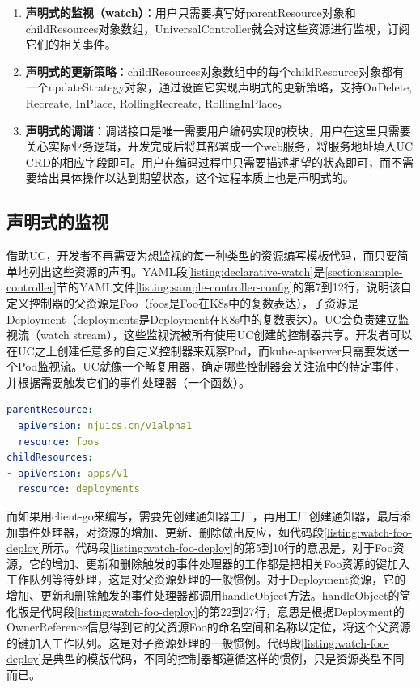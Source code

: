 \documentclass[macfonts,master]{njuthesis}
\begin{document}
\begin{enumerate}
	\item \textbf{声明式的监视（watch）}：用户只需要填写好parentResource对象和childResources对象数组，UniversalController就会对这些资源进行监视，订阅它们的相关事件。
	\item \textbf{声明式的更新策略}：childResources对象数组中的每个childResource对象都有一个updateStrategy对象，通过设置它实现声明式的更新策略，支持OnDelete, Recreate, InPlace, RollingRecreate, RollingInPlace。
	\item \textbf{声明式的调谐}：调谐接口是唯一需要用户编码实现的模块，用户在这里只需要关心实际业务逻辑，开发完成后将其部署成一个web服务，将服务地址填入UC CRD的相应字段即可。用户在编码过程中只需要描述期望的状态即可，而不需要给出具体操作以达到期望状态，这个过程本质上也是声明式的。
\end{enumerate}

\subsection{声明式的监视}

借助UC，开发者不再需要为想监视的每一种类型的资源编写模板代码，而只要简单地列出这些资源的声明。YAML段\ref{listing:declarative-watch}是\ref{section:sample-controller}节的YAML文件\ref{listing:sample-controller-config}的第7到12行，说明该自定义控制器的父资源是Foo（foos是Foo在K8s中的复数表达），子资源是Deployment（deployments是Deployment在K8s中的复数表达）。UC会负责建立监视流（watch stream），这些监视流被所有使用UC创建的控制器共享。开发者可以在UC之上创建任意多的自定义控制器来观察Pod，而kube-apiserver只需要发送一个Pod监视流。UC就像一个解复用器，确定哪些控制器会关注流中的特定事件，并根据需要触发它们的事件处理器（一个函数）。
\begin{lstlisting}[language=yaml,caption=声明式的监视,label=listing:declarative-watch]
parentResource:
  apiVersion: njuics.cn/v1alpha1
  resource: foos
childResources:
- apiVersion: apps/v1
  resource: deployments
\end{lstlisting}

而如果用client-go来编写，需要先创建通知器工厂，再用工厂创建通知器，最后添加事件处理器，对资源的增加、更新、删除做出反应，如代码段\ref{listing:watch-foo-deploy}所示。代码段\ref{listing:watch-foo-deploy}的第5到10行的意思是，对于Foo资源，它的增加、更新和删除触发的事件处理器的工作都是把相关Foo资源的键加入工作队列等待处理，这是对父资源处理的一般惯例。对于Deployment资源，它的增加、更新和删除触发的事件处理器都调用handleObject方法。handleObject的简化版是代码段\ref{listing:watch-foo-deploy}的第22到27行，意思是根据Deployment的OwnerReference信息得到它的父资源Foo的命名空间和名称以定位，将这个父资源的键加入工作队列。这是对子资源处理的一般惯例。代码段\ref{listing:watch-foo-deploy}是典型的模版代码，不同的控制器都遵循这样的惯例，只是资源类型不同而已。
\end{document}
